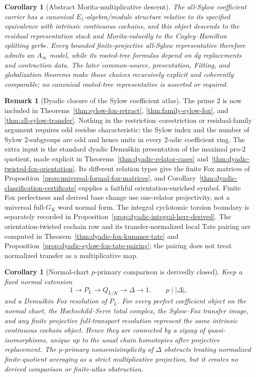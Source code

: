 \documentclass[11pt]{article}
\newtheorem{corollary}[theorem]{Corollary}
\theoremstyle{definition}
\newtheorem{remark}[theorem]{Remark}
\begin{document}
\begin{corollary}[Abstract Morita-multiplicative descent]\label{cor:abstract-morita-multiplicative}
The all-Sylow coefficient carrier has a canonical $E_1$-algebra/module structure relative to its specified equivalence with intrinsic continuous cochains, and this object descends to the residual representation stack and Morita-valuedly to the Cayley--Hamilton splitting gerbe.  Every bounded finite-projective all-Sylow representative therefore admits an $A_\infty$ model, while its rooted-tree formulas depend on dg replacements and contraction data.  The later common-source, presentation, Fitting, and globalization theorems make those choices recursively explicit and coherently comparable; no canonical rooted-tree representative is asserted or required.
\end{corollary}

\begin{remark}[Dyadic closure of the Sylow coefficient atlas]\label{rem:sylow-two}
The prime $2$ is now included in Theorems~\ref{thm:sylow-fox-retract}, \ref{thm:family-sylow-fox}, and \ref{thm:all-sylow-transfer}.  Nothing in the restriction--corestriction or residual-family argument requires odd residue characteristic: the Sylow index and the number of Sylow $2$-subgroups are odd and hence units in every $2$-adic coefficient ring.  The extra input is the standard dyadic Demu\v{s}kin presentation of the maximal pro-$2$ quotient, made explicit in Theorems~\ref{thm:dyadic-relator-cases} and~\ref{thm:dyadic-twisted-fox-orientation}.  Its different relation types give the finite Fox matrices of Proposition~\ref{prop:universal-formal-fox-matrices}, and Corollary~\ref{thm:dyadic-classification-certificate} supplies a faithful orientation-enriched symbol.  Finite Fox perfectness and derived base change use one-relator projectivity, not a universal full-$G_K$ word normal form.  The integral cyclotomic torsion boundary is separately recorded in Proposition~\ref{prop:dyadic-integral-herr-derived}.  The orientation-twisted cochain row and its transfer-normalized local Tate pairing are computed in Theorem~\ref{thm:dyadic-fox-kummer-tate} and Proposition~\ref{prop:dyadic-sylow-fox-tate-pairing}; the pairing does not treat normalized transfer as a multiplicative map.
\end{remark}

\begin{corollary}[Normal-chart $p$-primary comparison is derivedly closed]\label{cor:normal-p-primary-derived-comparison}
Keep a fixed normal extension
\[
1\to P_L\to Q_{L/K}\to\Delta\to1,
\qquad p\mid|\Delta|,
\]
and a Demu\v{s}kin Fox resolution of $P_L$.  For every perfect coefficient object on the normal chart, the Hochschild--Serre total complex, the Sylow--Fox transfer image, and any finite projective full-transport resolution represent the same intrinsic continuous cochain object.  Hence they are connected by a zigzag of quasi-isomorphisms, unique up to the usual chain homotopies after projective replacement.  The $p$-primary nonsemisimplicity of $\Delta$ obstructs treating normalized finite-quotient averaging as a strict multiplicative projection, but it creates no derived comparison or finite-atlas obstruction.
\end{corollary}
\end{document}
